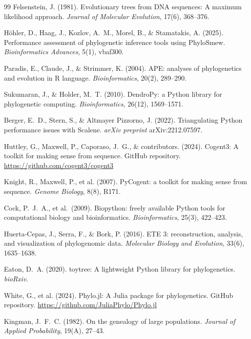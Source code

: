 \documentclass[11pt, a4paper]{article}
\begin{document}
\begin{thebibliography}{99}
Felsenstein, J. (1981).
Evolutionary trees from DNA sequences: A maximum likelihood approach.
\textit{Journal of Molecular Evolution}, 17(6), 368--376.

Höhler, D., Haag, J., Kozlov, A.~M., Morel, B., \& Stamatakis, A. (2025).
Performance assessment of phylogenetic inference tools using PhyloSmew.
\textit{Bioinformatics Advances}, 5(1), vbaf300.

Paradis, E., Claude, J., \& Strimmer, K. (2004).
APE: analyses of phylogenetics and evolution in R language.
\textit{Bioinformatics}, 20(2), 289--290.

Sukumaran, J., \& Holder, M.~T. (2010).
DendroPy: a Python library for phylogenetic computing.
\textit{Bioinformatics}, 26(12), 1569--1571.

Berger, E.~D., Stern, S., \& Altmayer Pizzorno, J. (2022).
Triangulating Python performance issues with Scalene.
\textit{arXiv preprint} arXiv:2212.07597.

Huttley, G., Maxwell, P., Caporaso, J.~G., \& contributors. (2024).
Cogent3: A toolkit for making sense from sequence.
GitHub repository. \url{https://github.com/cogent3/cogent3}

Knight, R., Maxwell, P., et al. (2007).
PyCogent: a toolkit for making sense from sequence.
\textit{Genome Biology}, 8(8), R171.

Cock, P.~J.~A., et al.\ (2009).
Biopython: freely available Python tools for computational biology and
bioinformatics.
\textit{Bioinformatics}, 25(3), 422--423.

Huerta-Cepas, J., Serra, F., \& Bork, P. (2016).
ETE 3: reconstruction, analysis, and visualization of phylogenomic data.
\textit{Molecular Biology and Evolution}, 33(6), 1635--1638.

Eaton, D.~A. (2020).
toytree: A lightweight Python library for phylogenetics.
\textit{bioRxiv}.

White, G., et al. (2024).
Phylo.jl: A Julia package for phylogenetics.
GitHub repository. \url{https://github.com/JuliaPhylo/Phylo.jl}

Kingman, J.~F.~C. (1982).
On the genealogy of large populations.
\textit{Journal of Applied Probability}, 19(A), 27--43.


\end{thebibliography}
\end{document}
